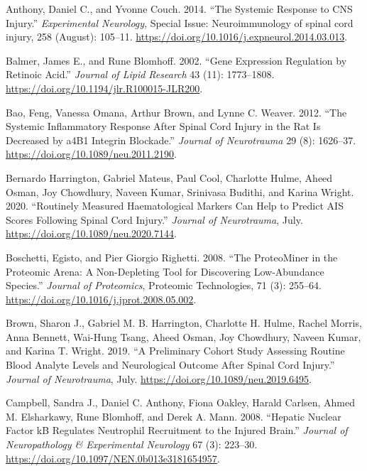 \documentclass[9pt,lineno]{elife}
\newlength{\cslhangindent}
\newlength{\cslentryspacingunit} %
\newenvironment{CSLReferences}[2] %
 {%
  \setlength{\parindent}{0pt}
  \ifodd #1
  \let\oldpar\par
  \def\par{\hangindent=\cslhangindent\oldpar}
  \fi
  \setlength{\parskip}{#2\cslentryspacingunit}
 }%
 {}
\begin{document}
\begin{landscape}
\begin{landscape}
\hypertarget{refs}{}
\begin{CSLReferences}{1}{0}
\leavevmode{}%
Anthony, Daniel C., and Yvonne Couch. 2014. {``The Systemic Response to {CNS} Injury.''} \emph{Experimental Neurology}, Special {Issue}: {Neuroimmunology} of spinal cord injury, 258 (August): 105--11. \url{https://doi.org/10.1016/j.expneurol.2014.03.013}.

\leavevmode{}%
Balmer, James E., and Rune Blomhoff. 2002. {``Gene Expression Regulation by Retinoic Acid.''} \emph{Journal of Lipid Research} 43 (11): 1773--1808. \url{https://doi.org/10.1194/jlr.R100015-JLR200}.

\leavevmode{}%
Bao, Feng, Vanessa Omana, Arthur Brown, and Lynne C. Weaver. 2012. {``The Systemic Inflammatory Response After Spinal Cord Injury in the Rat Is Decreased by {a4B1} Integrin Blockade.''} \emph{Journal of Neurotrauma} 29 (8): 1626--37. \url{https://doi.org/10.1089/neu.2011.2190}.

\leavevmode{}%
Bernardo Harrington, Gabriel Mateus, Paul Cool, Charlotte Hulme, Aheed Osman, Joy Chowdhury, Naveen Kumar, Srinivasa Budithi, and Karina Wright. 2020. {``Routinely Measured Haematological Markers Can Help to Predict {AIS} Scores Following Spinal Cord Injury.''} \emph{Journal of Neurotrauma}, July. \url{https://doi.org/10.1089/neu.2020.7144}.

\leavevmode{}%
Boschetti, Egisto, and Pier Giorgio Righetti. 2008. {``The {ProteoMiner} in the Proteomic Arena: {A} Non-Depleting Tool for Discovering Low-Abundance Species.''} \emph{Journal of Proteomics}, Proteomic {Technologies}, 71 (3): 255--64. \url{https://doi.org/10.1016/j.jprot.2008.05.002}.

\leavevmode{}%
Brown, Sharon J., Gabriel M. B. Harrington, Charlotte H. Hulme, Rachel Morris, Anna Bennett, Wai-Hung Tsang, Aheed Osman, Joy Chowdhury, Naveen Kumar, and Karina T. Wright. 2019. {``A Preliminary Cohort Study Assessing Routine Blood Analyte Levels and Neurological Outcome After Spinal Cord Injury.''} \emph{Journal of Neurotrauma}, July. \url{https://doi.org/10.1089/neu.2019.6495}.

\leavevmode{}%
Campbell, Sandra J., Daniel C. Anthony, Fiona Oakley, Harald Carlsen, Ahmed M. Elsharkawy, Rune Blomhoff, and Derek A. Mann. 2008. {``Hepatic {Nuclear Factor kB Regulates Neutrophil Recruitment} to the {Injured Brain}.''} \emph{Journal of Neuropathology \& Experimental Neurology} 67 (3): 223--30. \url{https://doi.org/10.1097/NEN.0b013e3181654957}.


\end{CSLReferences}
\end{landscape}
\end{landscape}
\end{document}
